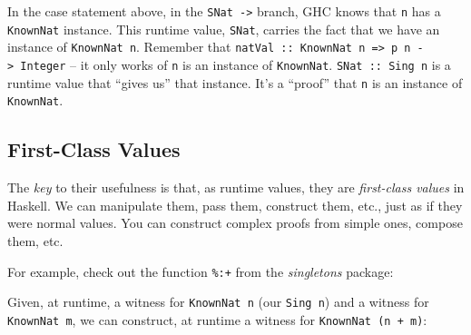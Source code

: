 \documentclass[]{article}
\newenvironment{Shaded}{}{}
\newcommand{\CommentTok}[1]{\textcolor[rgb]{0.38,0.63,0.69}{\textit{#1}}}
\newcommand{\DataTypeTok}[1]{\textcolor[rgb]{0.56,0.13,0.00}{#1}}
\newcommand{\FunctionTok}[1]{\textcolor[rgb]{0.02,0.16,0.49}{#1}}
\newcommand{\KeywordTok}[1]{\textcolor[rgb]{0.00,0.44,0.13}{\textbf{#1}}}
\newcommand{\NormalTok}[1]{#1}
\newcommand{\OtherTok}[1]{\textcolor[rgb]{0.00,0.44,0.13}{#1}}
\begin{document}
In the case statement above, in the \texttt{SNat\ -\textgreater{}} branch, GHC
knows that \texttt{n} has a \texttt{KnownNat} instance. This runtime value,
\texttt{SNat}, carries the fact that we have an instance of
\texttt{KnownNat\ n}. Remember that
\texttt{natVal\ ::\ KnownNat\ n\ =\textgreater{}\ p\ n\ -\textgreater{}\ Integer}
-- it only works of \texttt{n} is an instance of \texttt{KnownNat}.
\texttt{SNat\ ::\ Sing\ n} is a runtime value that ``gives us'' that instance.
It's a ``proof'' that \texttt{n} is an instance of \texttt{KnownNat}.

\hypertarget{first-class-values}{%
\subsection{First-Class Values}\label{first-class-values}}

The \emph{key} to their usefulness is that, as runtime values, they are
\emph{first-class values} in Haskell. We can manipulate them, pass them,
construct them, etc., just as if they were normal values. You can construct
complex proofs from simple ones, compose them, etc.

For example, check out the function \texttt{\%:+} from the \emph{singletons}
package:

\begin{Shaded}
\begin{Highlighting}[]
\OtherTok{(%:+) ::}\NormalTok{ forall (}\OtherTok{n ::} \DataTypeTok{Nat}\NormalTok{) (}\OtherTok{m ::} \DataTypeTok{Nat}\NormalTok{)}\FunctionTok{.} \DataTypeTok{Sing}\NormalTok{ n }\OtherTok{->} \DataTypeTok{Sing}\NormalTok{ m }\OtherTok{->} \DataTypeTok{Sing}\NormalTok{ (n }\FunctionTok{+}\NormalTok{ m)}
\end{Highlighting}
\end{Shaded}

Given, at runtime, a witness for \texttt{KnownNat\ n} (our \texttt{Sing\ n}) and
a witness for \texttt{KnownNat\ m}, we can construct, at runtime a witness for
\texttt{KnownNat\ (n\ +\ m)}:

\begin{Shaded}
\end{Shaded}
\end{document}
